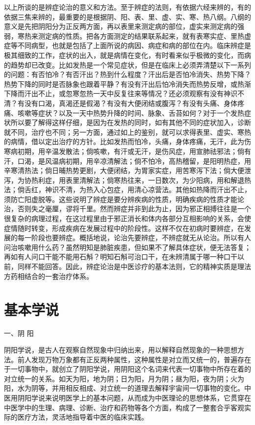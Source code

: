 \documentclass[12pt,UTF8]{ctexbook}
\begin{document}
以上所谈的是辨症论治的意义和方法。至于辨症的法则，有依据六经来辨的，有的依据三焦来辨的，最重要的是根据阴、阳、表、里、虚、实、寒、热八纲。八纲的意义是先把阴阳分为正反两方面，再以表里来测定病的部位，虚实来测定病的强弱，寒热来测定病的性质。把各方面测定的结果联系起来，就有表寒实症、里热虚症等不同病型，也就是包括了上面所说的病因、病症和病的部位在内。临床辨症是极其细致的工作，症状的出入，就是病情在变化，有时看来似乎极微的变化，而病的趋势却已改变。比如发热是一个常见症状，但是在临床上必须弄清楚以下一系列的问题：有否怕冷？有否汗出？热到什么程度？汗出后是否怕冷消失、热势下降？热势下降的同时是否脉象也跟着平静？有没有汗出后怕冷消失而热势反增，或热渐下降而汗出不止，或忽寒忽热一天中反复往来等情况？还必须观察有没有神识不清？有没有口渴，真渴还是假渴？有没有大便闭结或腹泻？有没有头痛、身体疼痛、咳嗽等症状？以及一天中热势升降的时间、脉象、舌苔如何？对于一个发热症状所以要了解得这样仔细，是因为在发热的同时，如有其他不同的症状加入，诊断就不同，治疗也不同；另一方面，通过如上的鉴别，就可以求得表里、虚实、寒热的病情，借以定出治疗的方针。比如发热而怕冷，头痛，身体疼痛，无汗，此为伤寒病初期，用辛温发散法；倘咳嗽，有汗或无汗，是伤风症，用宣肺祛邪法；倘有汗，口渴，是风温病初期，用辛凉清解法；倘不怕冷，高热稽留，是阳明热症，用辛寒清热法；倘日晡热势更剧，大便闭结，为胃家实症，用苦寒泻下法；倘大便泄泻，为协热利症，用表里清解法；倘寒热往来，一日数次，为少阳病，用和解退热法；倘舌红，神识不清，为热入心包症，用清心凉营法。其他如热降而汗出不止，须防亡阳虚脱等。这些说明了辨症是要分辨疾病的性质，明确疾病的性质才能论治，否则失之毫厘，谬将千里。然而辨症并非到此为止，因为邪正相搏往往是一个很复杂的病理过程，在这过程里由于邪正消长和体内各部分互相影响的关系，会使症情随时转变，形成疾病在发展过程中的阶段性。这样不仅在初病时要辨症，在发展的每一阶段也要辨症。概括地说，论治先要辨症，不辨症就无从论治。所以有人问治咳嗽用什么药？虽然明知是肺脏疾患，但如果不了解具体症状，便无法答复；再如有人问口干能不能用石斛？明知石斛可治口干，在未辨清属于哪一种口干以前，同样不能回答。因此，辨症论治是中医诊疗的基本法则，它的精神实质是理法方药相结合的一套治疗体系。

\section{基本学说}

一、阴 阳

阴阳学说，是古人在观察自然现象中归纳出来，用以解释自然现象的一种思想方法。前人发现万物万象都有正反两种属性，这种属性是对立而又统一的，普遍存在于一切事物中，就创立了阴阳学说，用阴阳这个名词来代表一切事物中所存在着的对立统一的关系。如天为阳，地为阴；日为阳，月为阴；昼为阳，夜为阴；火为阳，水为阴等，并用相反相成、对立统一的道理去解释宇宙间一切事物的变化。中医用阴阳学说来说明医学上的基本问题，从而成为中医理论的思想体系，它贯穿在中医学中的生理、病理、诊断、治疗和药物等各个方面，构成了一整套合乎客观实际的医疗方法，灵活地指导着中医的临床实践。
\end{document}
